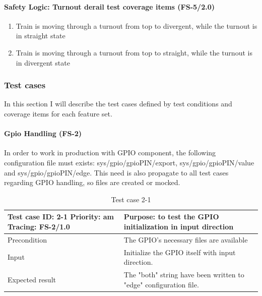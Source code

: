 \paragraph{Safety Logic: Turnout derail test coverage items (FS-5/2.0)}
\begin{enumerate}[label=FS-5/2.0-\arabic*, leftmargin=*, format=\small]
	\item Train is moving through a turnout from top to divergent, while the turnout is in straight state
	\item Train is moving through a turnout from top to straight, while the turnout is in divergent state
\end{enumerate}

\subsubsection{Test cases}\label{section:UnitTestCases}
In this section I will describe the test cases defined by test conditions and coverage items for each feature set.
\paragraph{Gpio Handling (FS-2)} In order to work in production with GPIO component, the following configuration file must exists: sys/gpio/gpioPIN/export, sys/gpio/gpioPIN/value and sys/gpio/gpioPIN/edge. This need is also propagate to all test cases regarding GPIO handling, so files are created or mocked.
\begin{table}[H]
	\caption{Test case 2-1}
	\label{table:TCase-FS2-1}
	\begin{center}
		\renewcommand{\arraystretch}{1.8}
		\begin{tabu} 
			to 0.9 \textwidth
			{  X[0.4, c] X[c] }
			\toprule
			Test case ID: 2-1 \newline Priority: am \newline Tracing: FS-2/1.0 & Purpose: to test the GPIO initialization in input direction       \\ \midrule
			Precondition                                                       & The GPIO's necessary files are available                          \\
			Input                                                              & Initialize the GPIO itself with input direction.                  \\
			Expected result                                                    & The "both" string have been written to "edge" configuration file. \\ \bottomrule
		\end{tabu}
	\end{center}
\end{table} 

